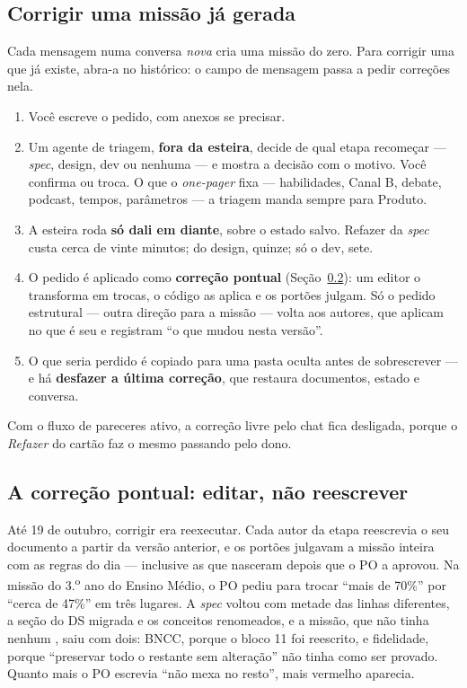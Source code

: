 \documentclass[11pt,a4paper]{article}
\newcommand{\bolinha}[1]{\tikz[baseline=-0.5ex]{\fill[#1] (0,0) circle (0.33em);}}
\newcommand{\statusVermelho}{\bolinha{sinalVermelho}}
\begin{document}
\subsection{Corrigir uma missão já gerada}

Cada mensagem numa conversa \emph{nova} cria uma missão do zero. Para corrigir uma que já existe, abra-a no histórico: o campo de mensagem passa a pedir correções nela.

\begin{enumerate}
  \item Você escreve o pedido, com anexos se precisar.
  \item Um agente de triagem, \textbf{fora da esteira}, decide de qual etapa recomeçar --- \emph{spec}, design, dev ou nenhuma --- e mostra a decisão com o motivo. Você confirma ou troca. O que o \emph{one-pager} fixa --- habilidades, Canal B, debate, podcast, tempos, parâmetros --- a triagem manda sempre para Produto.
  \item A esteira roda \textbf{só dali em diante}, sobre o estado salvo. Refazer da \emph{spec} custa cerca de vinte minutos; do design, quinze; só o dev, sete.
  \item O pedido é aplicado como \textbf{correção pontual} (Seção~\ref{sec:pontual}): um editor o transforma em trocas, o código as aplica e os portões julgam. Só o pedido estrutural --- outra direção para a missão --- volta aos autores, que aplicam no que é seu e registram ``o que mudou nesta versão''.
  \item O que seria perdido é copiado para uma pasta oculta antes de sobrescrever --- e há \textbf{desfazer a última correção}, que restaura documentos, estado e conversa.
\end{enumerate}

Com o fluxo de pareceres ativo, a correção livre pelo chat fica desligada, porque o \emph{Refazer} do cartão faz o mesmo passando pelo dono.

\subsection{A correção pontual: editar, não reescrever}
\label{sec:pontual}

Até 19 de outubro, corrigir era reexecutar. Cada autor da etapa reescrevia o seu documento a partir da versão anterior, e os portões julgavam a missão inteira com as regras do dia --- inclusive as que nasceram depois que o PO a aprovou. Na missão do 3.\textsuperscript{o} ano do Ensino Médio, o PO pediu para trocar ``mais de 70\%'' por ``cerca de 47\%'' em três lugares. A \emph{spec} voltou com metade das linhas diferentes, a seção do DS migrada e os conceitos renomeados, e a missão, que não tinha nenhum \statusVermelho, saiu com dois: BNCC, porque o bloco 11 foi reescrito, e fidelidade, porque ``preservar todo o restante sem alteração'' não tinha como ser provado. Quanto mais o PO escrevia ``não mexa no resto'', mais vermelho aparecia.
\end{document}
